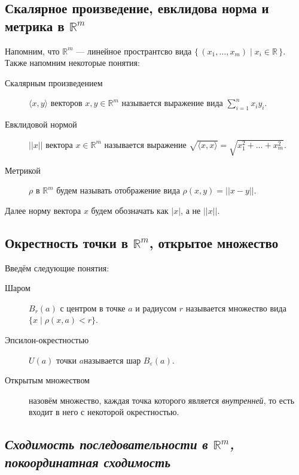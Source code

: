 \subsection{Скалярное произведение, евклидова норма и метрика в \(\mathbb{R}^m\)}

\begin{definition}
	Напомним, что \(\mathbb{R}^m\) --- линейное пространтсво вида \(\{\, (x_1, \ldots, x_m) \mid x_i \in \mathbb{R} \,\}\). Также напомним некоторые понятия:
	\begin{description}
		\item[Скалярным произведением] \(\langle x, y \rangle\) векторов \(x, y \in \mathbb{R}^m\) называется выражение вида \( \sum\limits_{i=1}^n x_i y_i\).
		\item[Евклидовой нормой] \(||x||\) вектора \(x \in \mathbb{R}^m\) называется выражение \(\sqrt{\langle x, x \rangle} = \sqrt{x_1^2 + \ldots + x_m^2}\).
		\item[Метрикой] \(\rho\) в \(\mathbb{R}^m\) будем называть отображение вида \(\rho(x, y) = || x - y||\). 
	\end{description}
\end{definition}

\begin{remark}
	Далее норму вектора \(x\) будем обозначать как  \(|x|\), а не \(||x||\).
\end{remark}

\subsection{Окрестность точки в \(\mathbb{R}^m\), открытое множество}

\begin{definition}
	Введём следующие понятия:
	\begin{description}
		\item[Шаром] \(B_r (a)\) с центром в точке \(a\) и радиусом \(r\) называется множество вида \(\{x \mid \rho(x, a) < r\}\).
		\item[Эпсилон-окрестностью] \(U(a)\) точки \(a\)называется шар \(B_\varepsilon (a)\).
		\item[Открытым множеством] назовём множество, каждая точка которого является \textit{внутренней}, то есть входит в него с некоторой окрестностью.
	\end{description}
\end{definition}

\subsection{\itshape Сходимость последовательности в \(\mathbb{R}^m\), покоординатная сходимость}


